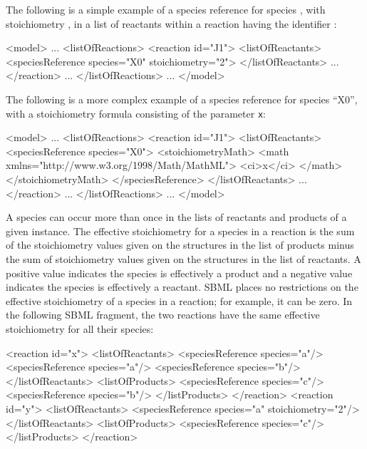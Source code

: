 The following is a simple example of a species reference for
species , with stoichiometry , in a list of
reactants within a reaction having the identifier :

\begin{example}
<model>
    ...
    <listOfReactions>
        <reaction id="J1">
            <listOfReactants>
                <speciesReference species="X0" stoichiometry="2">
            </listOfReactants>
            ...
        </reaction>
        ...
    </listOfReactions>
    ...
</model>
\end{example}

The following is a more complex example of a species reference for
species ``X0'', with a stoichiometry formula consisting of the
parameter \texttt{x}:

\begin{example}
<model>
    ...
    <listOfReactions>
        <reaction id="J1">
            <listOfReactants>
                <speciesReference species="X0">
                    <stoichiometryMath>
                        <math xmlns="http://www.w3.org/1998/Math/MathML">
                            <ci>x</ci>
                        </math>
                    </stoichiometryMath>
                </speciesReference>
            </listOfReactants>
            ...
        </reaction>
        ...
    </listOfReactions>
    ...
</model>
\end{example}

A species can occur more than once in the lists of reactants and
products of a given \Reaction instance.  The effective
stoichiometry for a species in a reaction is the sum of the
stoichiometry values given on the \SpeciesReference structures in
the list of products minus the sum of stoichiometry values given
on the \SpeciesReference structures in the list of reactants.  A
positive value indicates the species is effectively a product and
a negative value indicates the species is effectively a reactant.
SBML places no restrictions on the effective stoichiometry of a
species in a reaction; for example, it can be zero.  In the
following SBML fragment, the two reactions have the same effective
stoichiometry for all their species:

\begin{example}
<reaction id="x">
    <listOfReactants>
        <speciesReference species="a"/>
        <speciesReference species="a"/>
        <speciesReference species="b"/>
    </listOfReactants>
    <listOfProducts>
        <speciesReference species="c"/>
        <speciesReference species="b"/>
    </listProducts>
</reaction>
<reaction id="y">
    <listOfReactants>
        <speciesReference species="a" stoichiometry="2"/>
    </listOfReactants>
    <listOfProducts>
        <speciesReference species="c"/>
    </listProducts>
</reaction>
\end{example}


